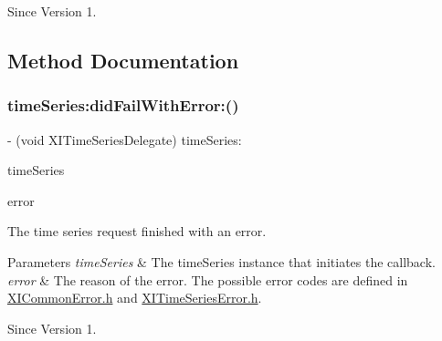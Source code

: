 \begin{DoxySince}{Since}
Version 1. 
\end{DoxySince}


\subsection{Method Documentation}
\hypertarget{protocol_x_i_time_series_delegate_01-p_a7ec763fef4ff3ee7b58b87ea0a855c2f}{}\label{protocol_x_i_time_series_delegate_01-p_a7ec763fef4ff3ee7b58b87ea0a855c2f} 
\subsubsection{\texorpdfstring{time\+Series\+:did\+Fail\+With\+Error\+:()}{timeSeries:didFailWithError:()}}
{\footnotesize\ttfamily -\/ (void X\+I\+Time\+Series\+Delegate) time\+Series\+: \begin{DoxyParamCaption}\item[{(id$<$ X\+I\+Time\+Series $>$)}]{time\+Series }\item[{didFailWithError:(N\+S\+Error $\ast$)}]{error }\end{DoxyParamCaption}}



The time series request finished with an error. 


\begin{DoxyParams}{Parameters}
{\em time\+Series} & The time\+Series instance that initiates the callback. \\
\hline
{\em error} & The reason of the error. The possible error codes are defined in \hyperlink{_x_i_common_error_8h}{X\+I\+Common\+Error.\+h} and \hyperlink{_x_i_time_series_error_8h}{X\+I\+Time\+Series\+Error.\+h}. \\
\hline
\end{DoxyParams}
\begin{DoxySince}{Since}
Version 1. 
\end{DoxySince}
\hypertarget{protocol_x_i_time_series_delegate_01-p_acb5b2883bf84fc539593d6821319cda1}{}\label{protocol_x_i_time_series_delegate_01-p_acb5b2883bf84fc539593d6821319cda1} 
